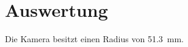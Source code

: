 \section{Auswertung}\label{sec:Auswertung}

Die Kamera besitzt einen Radius von \SI{51.3}{\milli\meter}.
